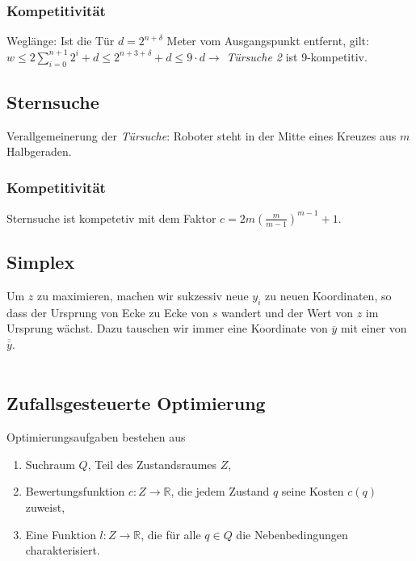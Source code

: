 \subsubsection{Kompetitivität}
Weglänge: Ist die Tür \(d = 2^{n+\delta}\) Meter vom Ausgangspunkt entfernt, gilt:\newline
\(w \leq 2 \sum\limits_{i=0}^{n+1} 2^i + d \leq 2 ^{n+3+\delta} + d \le 9 \cdot d \rightarrow\) \textit{Türsuche 2} ist 9-kompetitiv.


\subsection{Sternsuche}
Verallgemeinerung der \textit{Türsuche}: Roboter steht in der Mitte eines Kreuzes aus \(m\) Halbgeraden.
\text{}\\


\subsubsection{Kompetitivität}
Sternsuche ist kompetetiv mit dem Faktor \(c = 2m \left(\frac{m}{m-1}\right)^{m-1}+1\).


\subsection{Simplex}
Um \(z\) zu maximieren, machen wir sukzessiv neue \(y_i\) zu neuen Koordinaten, so dass der Ursprung von Ecke zu Ecke von \(s\) wandert und der Wert von \(z\) im Ursprung wächst. Dazu tauschen wir immer eine Koordinate von \(\overline{y}\) mit einer von \(\overline{\overline{y}}\).
\text{}\\

\text{}\\



\subsection{Zufallsgesteuerte Optimierung}
Optimierungsaufgaben bestehen aus 
\begin{enumerate}
	\item Suchraum $Q$, Teil des Zustandsraumes $Z$,
	\item Bewertungsfunktion $c: Z \rightarrow \mathbb{R}$, die jedem Zustand $q$ seine Kosten $c(q)$ zuweist,
	\item Eine Funktion $l: Z \rightarrow \mathbb{R}$, die für alle $q \in Q$ die Nebenbedingungen charakterisiert.
\end{enumerate}

